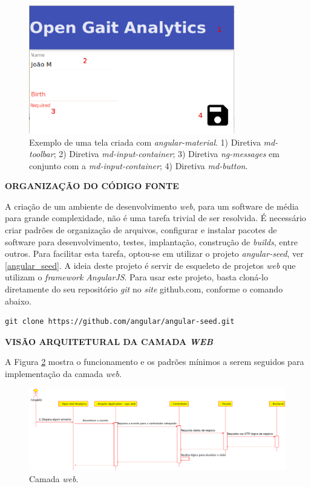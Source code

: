 \begin{figure}[H]
	\centering
	\includegraphics[width=9cm]{figuras/material_amostra.eps}
	\caption[Exemplo de uma tela criada com \emph{angular-material}.]{Exemplo de uma tela criada com \emph{angular-material}. 1) Diretiva \emph{md-toolbar}; 2) Diretiva \emph{md-input-container}; 3) Diretiva \emph{ng-messages} em conjunto com a \emph{md-input-container}; 4) Diretiva \emph{md-button}.}
	\label{material_amostra}
\end{figure}

\textbf{ORGANIZAÇÃO DO CÓDIGO FONTE}

\noindent
A criação de um ambiente de desenvolvimento \emph{web}, para um software de média para grande complexidade, não é uma tarefa trivial de ser resolvida.
É necessário criar padrões de organização de arquivos, configurar e instalar pacotes de software para desenvolvimento, testes, implantação, construção de \emph{builds}, entre outros.
Para facilitar esta tarefa, optou-se em utilizar o projeto \emph{angular-seed}, ver \ref{angular_seed}.
A ideia deste projeto é servir de esqueleto de projetos \emph{web} que utilizam o \emph{framework} \emph{AngularJS}.
Para usar este projeto, basta cloná-lo diretamente do seu repositório \emph{git} no \emph{site} github.com, conforme o comando abaixo.
\lstset{language=bash}
\begin{lstlisting}[frame=single]
git clone https://github.com/angular/angular-seed.git
\end{lstlisting}

\textbf{VISÃO ARQUITETURAL DA CAMADA \emph{WEB}}


\noindent
A Figura \ref{camda_web} mostra o funcionamento e os padrões mínimos a serem seguidos para implementação da camada \emph{web}.

\begin{figure}[H]
	\centering
	\includegraphics[width=17cm]{figuras/camada_web.eps}
	\caption{Camada \emph{web}.}
	\label{camda_web}
\end{figure}

